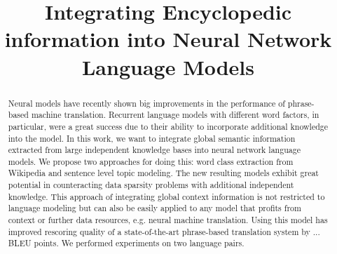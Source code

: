 \documentclass[a4paper]{article}
\title{Integrating Encyclopedic information into Neural Network Language Models}
\begin{document}
\maketitle
%
\begin{abstract}
Neural models have recently shown big improvements in the performance of phrase-based machine translation. Recurrent language models with different word factors, in particular, were a great success due to their ability to incorporate additional knowledge into the model. In this work, we want to integrate global semantic information extracted from large independent knowledge bases into neural network language models. We propose two approaches for doing this: word class extraction from Wikipedia and sentence level topic modeling. 
The new resulting models exhibit great potential in counteracting data sparsity problems with additional independent knowledge. This approach of integrating global context information is not restricted to language modeling but can also be easily applied to any model that profits from context or further data resources, e.g. neural machine translation. Using this model has improved rescoring quality of a state-of-the-art phrase-based translation system by ... BLEU points.  We performed experiments on two language pairs.



\end{abstract}


%
\end{document}
